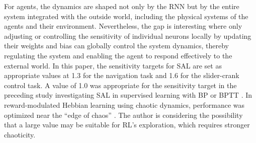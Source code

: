 %
%

For agents, the dynamics are shaped not only by the RNN
but by the entire system integrated with the outside world, including the physical systems of the agents and their environment.
Nevertheless, the gap is interesting where only adjusting or controlling the sensitivity of individual neurons locally
by updating their weights and bias can globally control the system dynamics,
thereby regulating the system and enabling the agent to respond effectively to the external world.
In this paper, the sensitivity targets for SAL are set as appropriate values
at 1.3 for the navigation task and 1.6 for the slider-crank control task.
A value of 1.0 was appropriate for the sensitivity target in the preceding study
investigating SAL in supervised learning with BP or BPTT \citep{Sensitivity}.
In reward-modulated Hebbian learning using chaotic dynamics, 
performance was optimized near the ``edge of chaos'' \citep{NN_Matsuki}.
The author is considering the possibility that a large value may be suitable for RL's exploration, which requires stronger chaoticity.


